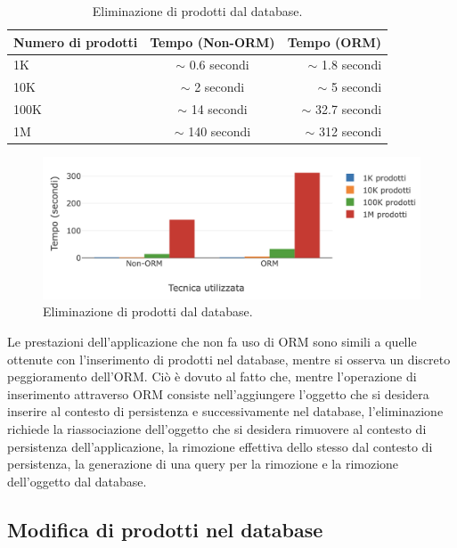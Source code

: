 \begin{table}[h!]
  \begin{center}
    \caption{Eliminazione di prodotti dal database.}
    \begin{tabular}{l|c|r} %
      \textbf{Numero di prodotti} & \textbf{Tempo (Non-ORM)} & \textbf{Tempo (ORM)}\\
      \hline
      1K & $\sim$ 0.6 secondi & $\sim$ 1.8 secondi\\
      10K & $\sim$ 2 secondi & $\sim$ 5 secondi\\
      100K & $\sim$ 14 secondi & $\sim$ 32.7 secondi\\
      1M & $\sim$ 140 secondi & $\sim$ 312 secondi\\
    \end{tabular}
  \end{center}
\end{table}

\begin{figure}[H]
  \includegraphics[width=\linewidth]{images/remove-products.png}
  \caption{Eliminazione di prodotti dal database.}
  \label{fig:removeproducts}
\end{figure}

Le prestazioni dell'applicazione che non fa uso di ORM sono simili a quelle ottenute con l'inserimento di prodotti nel database, mentre si osserva un discreto peggioramento dell'ORM. Ciò è dovuto al fatto che, mentre l'operazione di inserimento attraverso ORM consiste nell'aggiungere l'oggetto che si desidera inserire al contesto di persistenza e successivamente nel database, l'eliminazione richiede la riassociazione dell'oggetto che si desidera rimuovere al contesto di persistenza dell'applicazione, la rimozione effettiva dello stesso dal contesto di persistenza, la generazione di una query per la rimozione e la rimozione dell'oggetto dal database.

\newpage 

\subsection{Modifica di prodotti nel database}

